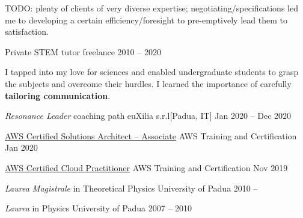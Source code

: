 \documentclass[9pt]{scrartcl}
\newlength{\Pad}\setlength{\Pad}{0.2in}
\begin{document}
TODO: plenty of clients of very diverse expertise; negotiating/specifications led me to developing a certain efficiency/foresight to pre-emptively lead them to satisfaction.


\Event
  {Private STEM tutor}
  {freelance}
  {2010 -- 2020}

I tapped into my love for sciences
and enabled undergraduate students
to grasp the subjects and overcome their hurdles.
I learned the importance of carefully \textbf{tailoring communication}.



\Event
  {\emph{Resonance Leader} coaching path}
  {euXilia s.r.l}[Padua, IT]
  {Jan 2020 -- Dec 2020}

\Event
  {\href{https://www.youracclaim.com/badges/29b5104b-8583-4921-8426-f2b90ac94fd6/public_url}{\enspace AWS Certified Solutions Architect -- Associate}}
  {AWS Training and Certification}
  {Jan 2020}

\Event
  {\href{https://www.youracclaim.com/badges/b024d274-84a9-4fff-be23-6fc8bf5ea40f/public_url}{\enspace AWS Certified Cloud Practitioner}}
  {AWS Training and Certification}
  {Nov 2019}

\Event
  {\emph{Laurea Magistrale} in Theoretical Physics}
  {University of Padua}
  {2010 -- }


\Event
  {\emph{Laurea} in Physics}
  {University of Padua}
  {2007 -- 2010}

\end{document}
